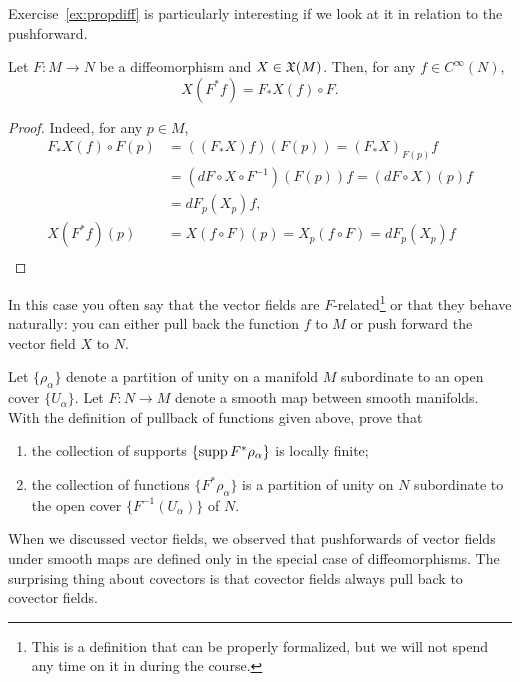 Exercise~\ref{ex:propdiff} is particularly interesting if we look at it in relation to the pushforward.
\begin{proposition}
  Let $F:M\to N$ be a diffeomorphism and $X\in\mathfrak{X}(M)$.
  Then, for any $f\in C^\infty(N)$,
  \begin{equation}
    X(F^* f) = F_*X(f) \circ F.
  \end{equation}
\end{proposition}
\begin{proof}
  Indeed, for any $p\in M$,
  \begin{align}
    F_*X(f) \circ F(p) & = ((F_*X) f) (F(p)) = (F_*X)_{F(p)} f                  \\
                       & = (dF \circ X \circ F^{-1})(F(p)) f = (dF\circ X)(p) f \\
                       & = dF_p(X_p) f,                                         \\
    X (F^*f)(p)        & = X(f\circ F)(p) = X_p(f\circ F) = dF_p(X_p) f         \\
  \end{align}
\end{proof}
In this case you often say that the vector fields are $F$-related\footnote{This is a definition that can be properly formalized, but we will not spend any time on it in during the course.} or that they behave naturally: you can either pull back the function $f$ to $M$ or push forward the vector field $X$ to $N$.

\begin{exercise}
  Let $\{\rho_\alpha\}$ denote a partition of unity on a manifold $M$ subordinate to an open cover $\{U_\alpha\}$.
  Let $F:N\to M$ denote a smooth map between smooth manifolds.
  With the definition of pullback of functions given above, prove that
  \begin{enumerate}
    \item the collection of supports $\{\operatorname{supp} F^*\rho_\alpha\}$ is locally finite;
    \item the collection of functions $\{F^*\rho_\alpha\}$ is a partition of unity on $N$ subordinate to the open cover $\{F^{-1}(U_\alpha)\}$ of $N$.
  \end{enumerate}
\end{exercise}

When we discussed vector fields, we observed that pushforwards of vector fields under smooth maps are defined only in the special case of diffeomorphisms.
The surprising thing about covectors is that covector fields always pull back to covector fields.

